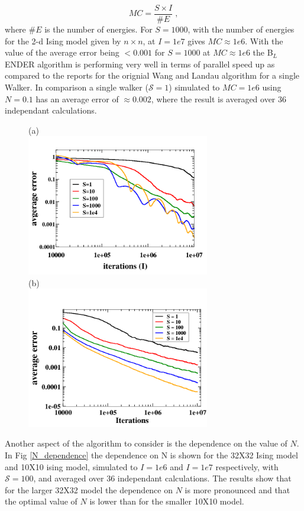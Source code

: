\documentclass[aps,prl,reprint,superscriptaddress,showkeys]{revtex4-1}
\begin{document}
\begin{equation}
MC = \frac{S\times I}{\#E} \;,
\end{equation} 
where $\#E$ is the number of energies.  For $S=1000$, with the number of energies for the 2-d Ising model given by $n\times n$, at $I=1e7$ gives $MC \approx 1e6$. With the value of the average error being $<0.001$ for $S=1000$ at $MC\approx 1e6$ the B$_L$ENDER algorithm is performing very well in terms of parallel speed up as compared to the reports for the orignial Wang and Landau algorithm for a single Walker.  In comparison a single walker ($\mathcal{S}=1$) simulated to $MC = 1e6$ using $N=0.1$ has an average error of $\approx 0.002$, where the result is averaged over 36 independant calculations.
\begin{figure}
(a)\\
\includegraphics[width=8cm]{./figures/thirtytwo_root0_1_varyS.png}\\
(b)\\
\includegraphics[width=8cm]{./figures/10X10_root1_varyS.png}
\caption{\label{thirtytwo_Stest}}
\end{figure}

Another aspect of the algorithm to consider is the dependence on the value of $N$. In Fig \ref{N_dependence} the dependence on N is shown for  the 32X32 Ising model and  10X10 ising model, simulated to $I=1e6$ and $I=1e7$ respectively, with $\mathcal{S}=100$, and averaged over 36 independant calculations. The results show that for the larger 32X32 model the dependence on $N$ is more pronounced and that the optimal value of $N$ is lower than for the smaller 10X10 model. 
\end{document}

